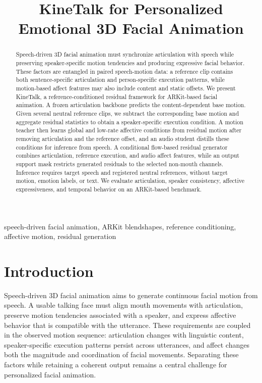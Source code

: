 \documentclass[conference]{IEEEtran}
\title{KineTalk for Personalized Emotional 3D Facial Animation}
\author{\IEEEauthorblockN{Author Name}
\IEEEauthorblockA{\textit{Department or Institution}\\
City, Country\\
author@example.com}}
\begin{document}
\maketitle

\begin{abstract}
Speech-driven 3D facial animation must synchronize articulation with speech while preserving speaker-specific motion tendencies and producing expressive facial behavior. These factors are entangled in paired speech-motion data: a reference clip contains both sentence-specific articulation and person-specific execution patterns, while motion-based affect features may also include content and static offsets. We present KineTalk, a reference-conditioned residual framework for ARKit-based facial animation. A frozen articulation backbone predicts the content-dependent base motion. Given several neutral reference clips, we subtract the corresponding base motion and aggregate residual statistics to obtain a speaker-specific execution condition. A motion teacher then learns global and low-rate affective conditions from residual motion after removing articulation and the reference offset, and an audio student distills these conditions for inference from speech. A conditional flow-based residual generator combines articulation, reference execution, and audio affect features, while an output support mask restricts generated residuals to the selected non-mouth channels. Inference requires target speech and registered neutral references, without target motion, emotion labels, or text. We evaluate articulation, speaker consistency, affective expressiveness, and temporal behavior on an ARKit-based benchmark.
\end{abstract}

\begin{IEEEkeywords}
speech-driven facial animation, ARKit blendshapes, reference conditioning, affective motion, residual generation
\end{IEEEkeywords}

\section{Introduction}
Speech-driven 3D facial animation aims to generate continuous facial motion from speech. A usable talking face must align mouth movements with articulation, preserve motion tendencies associated with a speaker, and express affective behavior that is compatible with the utterance. These requirements are coupled in the observed motion sequence: articulation changes with linguistic content, speaker-specific execution patterns persist across utterances, and affect changes both the magnitude and coordination of facial movements. Separating these factors while retaining a coherent output remains a central challenge for personalized facial animation.
\end{document}

